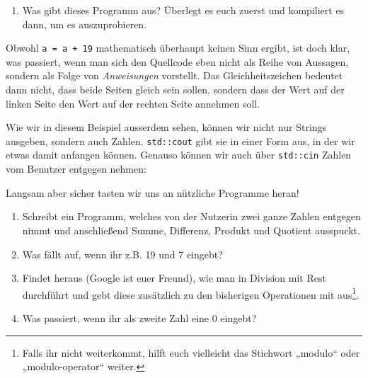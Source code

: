 \begin{praxis}
    \begin{enumerate}
        \item Was gibt dieses Programm aus? Überlegt es euch zuerst und kompiliert
              es dann, um es auszuprobieren.
    \end{enumerate}

    Obwohl \texttt{a = a + 19} mathematisch überhaupt keinen Sinn ergibt, ist doch
    klar, was passiert, wenn man sich den Quellcode eben nicht als Reihe von
    Aussagen, sondern als Folge von \emph{Anweisungen} vorstellt. Das
    Gleichheitszeichen bedeutet dann nicht, dass beide Seiten gleich sein sollen,
    sondern dass der Wert auf der linken Seite den Wert auf der rechten Seite
    annehmen soll.

    Wie wir in diesem Beispiel ausserdem sehen, können wir nicht nur Strings
    ausgeben, sondern auch Zahlen. \texttt{std::cout} gibt sie in einer Form aus,
    in der wir etwas damit anfangen können. Genauso können wir auch über
    \texttt{std::cin} Zahlen vom Benutzer entgegen nehmen:


    Langsam aber sicher tasten wir uns an nützliche Programme heran!

    \begin{enumerate}[resume]
        \item Schreibt ein Programm, welches von der Nutzerin zwei ganze Zahlen
              entgegen nimmt und anschließend Summe, Differenz, Produkt und Quotient
              ausspuckt.
        \item Was fällt auf, wenn ihr z.B. 19 und 7 eingebt?
        \item Findet heraus (Google ist euer Freund), wie man in \Cpp Division mit
              Rest durchführt und gebt diese zusätzlich zu den bisherigen Operationen
              mit aus\footnote{Falls ihr nicht weiterkommt, hilft euch vielleicht das
                  Stichwort „modulo“ oder „modulo-operator“ weiter.}.
        \item Was passiert, wenn ihr als zweite Zahl eine 0 eingebt?
    \end{enumerate}
\end{praxis}

